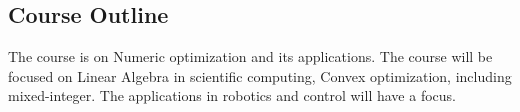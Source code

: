 \documentclass[11pt,a4paper]{article}
\begin{document}


\subsection{Course Outline}
The course is on Numeric optimization and its applications. The course will be focused on Linear Algebra in scientific computing, Convex optimization, including mixed-integer. The applications in robotics and control will have a focus. 






\end{document}
